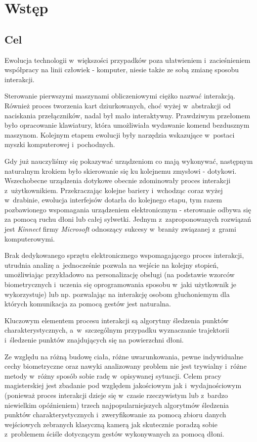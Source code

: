 \chapter{Wstęp}\label{Chapter_Wstep}

  \section{Cel}\label{Section_Aim}
    Ewolucja technologii w~większości przypadków poza ułatwieniem i~zacieśnieniem współpracy na linii człowiek - komputer, niesie także ze sobą zmianę sposobu interakcji.

    Sterowanie pierwszymi maszynami obliczeniowymi ciężko nazwać interakcją. Również proces tworzenia kart dziurkowanych, choć wyżej w~abstrakcji od naciskania przełączników, nadal był mało interaktywny. Prawdziwym przełomem było opracowanie klawiatury, która umożliwiała wydawanie komend bezdusznym maszynom. Kolejnym etapem ewolucji były narzędzia wskazujące w~postaci myszki komputerowej i~pochodnych.

    Gdy już nauczyliśmy się pokazywać urządzeniom co mają wykonywać, następnym naturalnym krokiem było skierowanie się ku kolejnemu zmysłowi - dotykowi. Wszechobecne urządzenia dotykowe obecnie zdominowały proces interakcji z~użytkownikiem. Przekraczając kolejne bariery i~wchodząc coraz wyżej w~drabinie, ewolucja interfejsów dotarła do kolejnego etapu, tym razem pozbawionego wspomagania urządzeniem elektronicznym - sterowanie odbywa się za pomocą ruchu dłoni lub całej sylwetki. Jednym z~zaproponowanych rozwiązań jest \textit{Kinnect} firmy \textit{Microsoft} odnoszący sukcesy w~branży związanej z~grami komputerowymi.

    Brak dedykowanego sprzętu elektronicznego wspomagającego proces interakcji, utrudnia analizę a~jednocześnie pozwala na wejście na kolejny stopień, umożliwiając przykładowo na personalizację obsługi (na podstawie wzorców biometrycznych i~uczenia się oprogramowania sposobu w~jaki użytkownik je wykorzystuje) lub np. pozwalając na interakcję osobom głuchoniemym dla których komunikacja za pomocą gestów jest naturalna.

    Kluczowym elementem procesu interakcji są algorytmy śledzenia punktów charakterystycznych, a~w~szczególnym przypadku wyznaczanie trajektorii i~śledzenie punktów znajdujących się na powierzchni dłoni.

    Ze względu na różną budowę ciała, różne uwarunkowania, pewne indywidualne cechy biometryczne oraz nawyki analizowany problem nie jest trywialny i~różne metody w~różny sposób sobie radę w~opisywanej sytuacji. Celem pracy magisterskiej jest zbadanie pod względem jakościowym jak i~wydajnościowym (ponieważ proces interakcji dzieje się w~czasie rzeczywistym lub z~bardzo niewielkim opóźnieniem) trzech najpopularniejszych algorytmów śledzenia punktów charakterystycznych i~zweryfikowanie za pomocą zbioru danych wejściowych zebranych klasyczną kamerą jak skutecznie poradzą sobie z~problemem ściśle dotyczącym gestów wykonywanych za pomocą dłoni.

